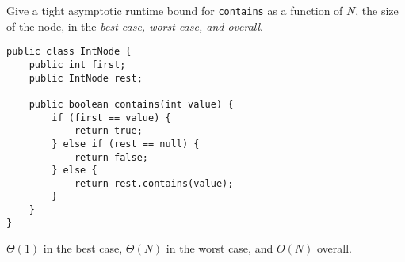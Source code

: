 \begin{blocksection}
\question Give a tight asymptotic runtime bound for \lstinline$contains$ as a
function of $N$, the size of the node, in the \emph{best case, worst case, and
overall}.

\begin{lstlisting}
public class IntNode {
    public int first;
    public IntNode rest;

    public boolean contains(int value) {
        if (first == value) {
            return true;
        } else if (rest == null) {
            return false;
        } else {
            return rest.contains(value);
        }
    }
}
\end{lstlisting}

\begin{solution}[0.5in]
$\Theta(1)$ in the best case, $\Theta(N)$ in the worst case, and $O(N)$ overall.
\end{solution}
\end{blocksection}
